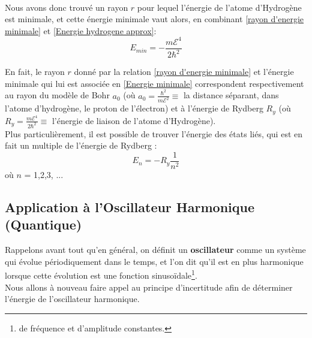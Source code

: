 \documentclass[../Notes de cours]{subfiles}
\begin{document}
\paragraph{} Nous avons donc trouvé un rayon $r$ pour lequel l'énergie de l'atome d'Hydrogène est minimale, et cette énergie minimale vaut alors, en combinant \ref{rayon d'energie minimale} et \ref{Energie hydrogene approx}: \begin{equation}
    \label{Energie minimale}
    E_{min} = - \frac{m\mathcal{E}^4}{2 \hbar^2}
\end{equation}

En fait, le rayon $r$ donné par la relation \ref{rayon d'energie minimale} et l'énergie minimale qui lui est associée en \ref{Energie minimale} correspondent respectivement au rayon du modèle de Bohr $a_0$ (où $a_0 = \frac{\hbar^2}{m\mathcal{E}^2} \equiv$ la distance séparant, dans l'atome d'hydrogène, le proton de l'électron) et à l'énergie de Rydberg $R_y$ (où $R_y = \frac{m\mathcal{E}^4}{2\hbar^2} \equiv$ l'énergie de liaison de l'atome d'Hydrogène). \\

Plus particulièrement, il est possible de trouver l'énergie des états liés, qui est en fait un multiple de l'énergie de Rydberg :
\begin{equation}
\label{Etats liés}
E_n = - R_y \frac{1}{n^2}
\end{equation}
où $n$ = 1,2,3, ...


\subsection{Application à l'Oscillateur Harmonique (Quantique) }
\label{Application à l'Oscillateur Harmonique Quantique}

Rappelons avant tout qu'en général, on définit un \textbf{oscillateur} comme un système qui évolue périodiquement dans le temps, et l'on dit qu'il est en plus harmonique lorsque cette évolution est une fonction sinusoïdale\footnote{de fréquence et d'amplitude constantes.}. \\
Nous allons à nouveau faire appel au principe d'incertitude afin de déterminer l'énergie de l'oscillateur harmonique. 

\end{document}
